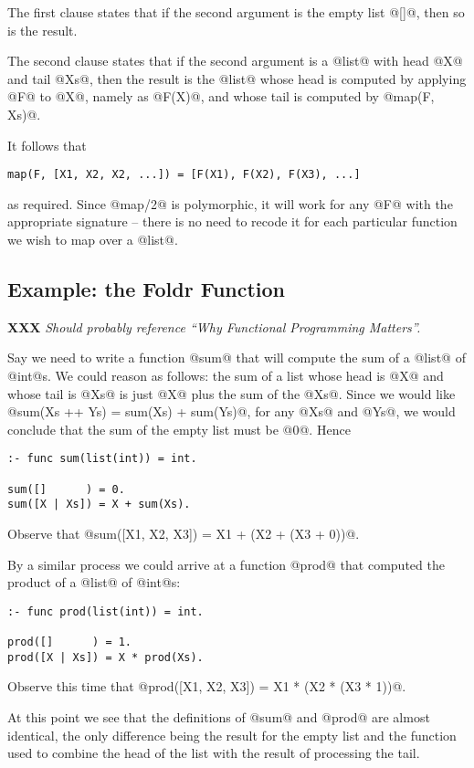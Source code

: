 \documentclass[a4paper,11pt,notitlepage,onecolumn]{article}
\newcommand{\XXX}[1]%
{{\small\textbf{XXX} \emph{#1}}}
\begin{document}
The first clause states that if the second argument is the empty list
@[]@, then so is the result.

The second clause states that if the second argument is a @list@ with head
@X@ and tail @Xs@, then the result is the @list@ whose head is computed by
applying @F@ to @X@, namely as @F(X)@, and whose tail is computed by
@map(F, Xs)@.

It follows that
\begin{verbatim}
map(F, [X1, X2, X2, ...]) = [F(X1), F(X2), F(X3), ...]
\end{verbatim}
as required.  Since @map/2@ is polymorphic, it will work for any @F@
with the appropriate signature -- there is no need to recode it for each
particular function we wish to map over a @list@.

\subsection{Example: the Foldr Function}

\XXX{Should probably reference ``Why Functional Programming Matters''.}

Say we need to write a function @sum@ that will compute the sum of a
@list@ of @int@s.  We could reason as follows: the sum of a list whose
head is @X@ and whose tail is @Xs@ is just @X@ plus the sum of the @Xs@.
Since we would like @sum(Xs ++ Ys) = sum(Xs) + sum(Ys)@, for any @Xs@
and @Ys@, we would conclude that the sum of the empty list must be @0@.
Hence
\begin{verbatim}
:- func sum(list(int)) = int.

sum([]      ) = 0.
sum([X | Xs]) = X + sum(Xs).
\end{verbatim}
Observe that @sum([X1, X2, X3]) = X1 + (X2 + (X3 + 0))@.

By a similar process we could arrive at a function @prod@ that computed
the product of a @list@ of @int@s:
\begin{verbatim}
:- func prod(list(int)) = int.

prod([]      ) = 1.
prod([X | Xs]) = X * prod(Xs).
\end{verbatim}
Observe this time that @prod([X1, X2, X3]) = X1 * (X2 * (X3 * 1))@.

At this point we see that the definitions of @sum@ and @prod@ are almost
identical, the only difference being the result for the empty list and
the function used to combine the head of the list with the result of
processing the tail.
\end{document}
